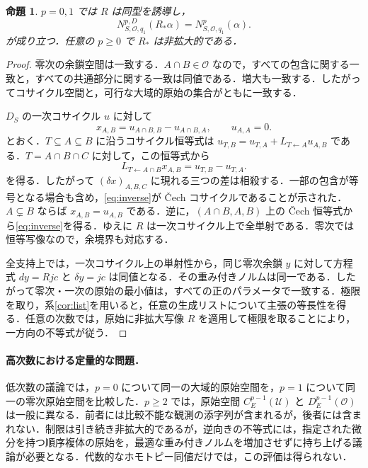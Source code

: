 \documentclass[11pt,a4paper]{article}
\numberwithin{equation}{section}
\theoremstyle{japanese}
\newtheorem{proposition}[theorem]{命題}
\theoremstyle{remark}
\newcommand{\OO}{\mathcal O}
\begin{document}
\begin{proposition}\label{prop:order}
$p=0,1$ では $R$ は同型を誘導し，
\[
 N^{p,D}_{S,\OO,q_1}(R_*\alpha)=N^p_{S,\OO,q_1}(\alpha).
\]
が成り立つ．任意の $p\ge0$ で $R_*$ は非拡大的である．
\end{proposition}
\begin{proof}
零次の余鎖空間は一致する．$A\cap B\in\OO$ なので，すべての包含に関する一致と，すべての共通部分に関する一致は同値である．増大も一致する．したがってコサイクル空間と，可行な大域的原始の集合がともに一致する．

$D_S$ の一次コサイクル $u$ に対して
\begin{equation}\label{eq:inverse}
 x_{A,B}=u_{A\cap B,B}-u_{A\cap B,A},\qquad u_{A,A}=0.
\end{equation}
とおく．$T\subseteq A\subseteq B$ に沿うコサイクル恒等式は $u_{T,B}=u_{T,A}+L_{T\leftarrow A}u_{A,B}$ である．$T=A\cap B\cap C$ に対して，この恒等式から
\[
 L_{T\leftarrow A\cap B}x_{A,B}=u_{T,B}-u_{T,A}.
\]
を得る．したがって $(\delta x)_{A,B,C}$ に現れる三つの差は相殺する．一部の包含が等号となる場合も含め，\eqref{eq:inverse}が {\latinfont\v{C}ech} コサイクルであることが示された．$A\subsetneq B$ ならば $x_{A,B}=u_{A,B}$ である．逆に，$(A\cap B,A,B)$ 上の {\latinfont\v{C}ech} 恒等式から\eqref{eq:inverse}を得る．ゆえに $R$ は一次コサイクル上で全単射である．零次では恒等写像なので，余境界も対応する．

全支持上では，一次コサイクル上の単射性から，同じ零次余鎖 $y$ に対して方程式 $dy=Rjc$ と $\delta y=jc$ は同値となる．その重み付きノルムは同一である．したがって零次・一次の原始の最小値は，すべての正のパラメータで一致する．極限を取り，系\ref{cor:list}を用いると，任意の生成リストについて主張の等長性を得る．任意の次数では，原始に非拡大写像 $R$ を適用して極限を取ることにより，一方向の不等式が従う．
\end{proof}

\paragraph{高次数における定量的な問題．}
低次数の議論では，$p=0$ について同一の大域的原始空間を，$p=1$ について同一の零次原始空間を比較した．$p\ge2$ では，原始空間 $C_E^{p-1}(\mathcal U)$ と $D_E^{p-1}(\OO)$ は一般に異なる．前者には比較不能な観測の添字列が含まれるが，後者には含まれない．制限は引き続き非拡大的であるが，逆向きの不等式には，指定された微分を持つ順序複体の原始を，最適な重み付きノルムを増加させずに持ち上げる議論が必要となる．代数的なホモトピー同値だけでは，この評価は得られない．
\end{document}
